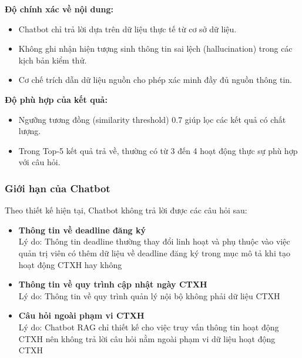 \textbf{Độ chính xác về nội dung:}
\begin{itemize}
    \item Chatbot chỉ trả lời dựa trên dữ liệu thực tế từ cơ sở dữ liệu.
    \item Không ghi nhận hiện tượng sinh thông tin sai lệch (hallucination) trong các kịch bản kiểm thử.
    \item Cơ chế trích dẫn dữ liệu nguồn cho phép xác minh đầy đủ nguồn thông tin.
\end{itemize}

\textbf{Độ phù hợp của kết quả:}
\begin{itemize}
    \item Ngưỡng tương đồng (similarity threshold) 0.7 giúp lọc các kết quả có chất lượng.
    \item Trong Top-5 kết quả trả về, thường có từ 3 đến 4 hoạt động thực sự phù hợp với câu hỏi.
\end{itemize}

\subsubsection{Giới hạn của Chatbot}
Theo thiết kế hiện tại, Chatbot không trả lời được các câu hỏi sau:

\begin{itemize}
    \item \textbf{Thông tin về deadline đăng ký}\\
    Lý do: Thông tin deadline thường thay đổi linh hoạt và phụ thuộc vào việc quản trị viên có thêm dữ liệu về deadline đăng ký trong mục mô tả khi tạo hoạt động CTXH hay không
    
    \item \textbf{Thông tin về quy trình cập nhật ngày CTXH}\\
    Lý do: Thông tin về quy trình quản lý nội bộ không phải dữ liệu CTXH
    
    \item \textbf{Câu hỏi ngoài phạm vi CTXH}\\
    Lý do: Chatbot RAG chỉ thiết kế cho việc truy vấn thông tin hoạt động CTXH nên không trả lời câu hỏi nằm ngoài phạm vi dữ liệu hoạt động CTXH
\end{itemize}

